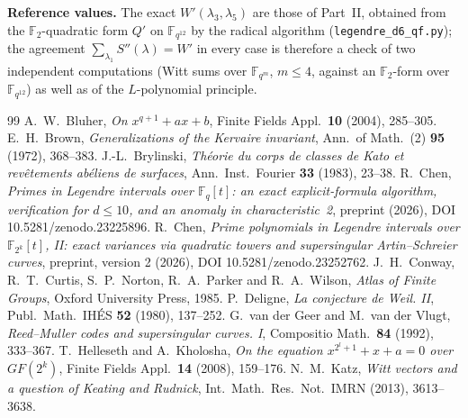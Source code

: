 \documentclass[12pt,a4paper]{amsart}
\theoremstyle{definition}
\newcommand{\F}{\mathbb{F}}
\newcommand{\Spp}{S''}
\begin{document}
\textbf{Reference values.} The exact $W'(\lambda_3,\lambda_5)$ are those of Part~II, obtained from the $\F_2$-quadratic form $Q'$ on $\F_{q^{12}}$ by the radical algorithm (\texttt{legendre\_d6\_qf.py}); the agreement $\sum_{\lambda_1}\Spp(\lambda)=W'$ in every case is therefore a check of two independent computations (Witt sums over $\F_{q^m}$, $m\le4$, against an $\F_2$-form over $\F_{q^{12}}$) as well as of the $L$-polynomial principle.

\clearpage
\begin{thebibliography}{99}
 A.~W.~Bluher, \emph{On $x^{q+1}+ax+b$}, Finite Fields Appl.\ \textbf{10} (2004), 285--305.
 E.~H.~Brown, \emph{Generalizations of the Kervaire invariant}, Ann.\ of Math.\ (2) \textbf{95} (1972), 368--383.
 J.-L.~Brylinski, \emph{Th\'eorie du corps de classes de Kato et rev\^etements ab\'eliens de surfaces}, Ann.\ Inst.\ Fourier \textbf{33} (1983), 23--38.
 R.~Chen, \emph{Primes in Legendre intervals over $\F_q[t]$: an exact explicit-formula algorithm, verification for $d\le10$, and an anomaly in characteristic~2}, preprint (2026), DOI 10.5281/zenodo.23225896.
 R.~Chen, \emph{Prime polynomials in Legendre intervals over $\F_{2^k}[t]$, II: exact variances via quadratic towers and supersingular Artin--Schreier curves}, preprint, version 2 (2026), DOI 10.5281/zenodo.23252762.
 J.~H.~Conway, R.~T.~Curtis, S.~P.~Norton, R.~A.~Parker and R.~A.~Wilson, \emph{Atlas of Finite Groups}, Oxford University Press, 1985.
 P.~Deligne, \emph{La conjecture de Weil. II}, Publ.\ Math.\ IH\'ES \textbf{52} (1980), 137--252.
 G.~van der Geer and M.~van der Vlugt, \emph{Reed--Muller codes and supersingular curves. I}, Compositio Math.\ \textbf{84} (1992), 333--367.
 T.~Helleseth and A.~Kholosha, \emph{On the equation $x^{2^l+1}+x+a=0$ over $GF(2^k)$}, Finite Fields Appl.\ \textbf{14} (2008), 159--176.
 N.~M.~Katz, \emph{Witt vectors and a question of Keating and Rudnick}, Int.\ Math.\ Res.\ Not.\ IMRN (2013), 3613--3638.
\end{thebibliography}
\end{document}

